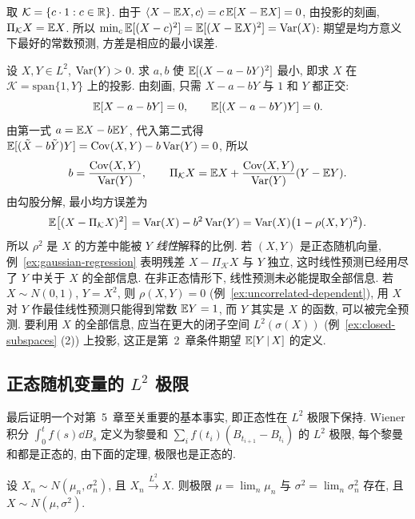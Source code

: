 \begin{example}[最佳常数预测]\label{ex:best-constant}
取 $\mathcal{K}=\{c\cdot1: c\in\mathbb{R}\}$. 由于 $\langle X-\mathbb{E} X,c\rangle=c\,\mathbb{E}[X-\mathbb{E} X]=0$, 由投影的刻画, $\Pi_{\mathcal{K}}X=\mathbb{E} X$. 所以 $\min_c\mathbb{E}[(X-c)^2]=\mathbb{E}[(X-\mathbb{E} X)^2]=\operatorname{Var}(X)$: 期望是均方意义下最好的常数预测, 方差是相应的最小误差.
\end{example}

\begin{example}[最佳线性预测]\label{ex:best-linear}
设 $X,Y\in L^2$, $\operatorname{Var}(Y)>0$. 求 $a,b$ 使 $\mathbb{E}[(X-a-bY)^2]$ 最小, 即求 $X$ 在 $\mathcal{K}=\mathrm{span}\{1,Y\}$ 上的投影. 由刻画, 只需 $X-a-bY$ 与 $1$ 和 $Y$ 都正交:
\[
\mathbb{E}[X-a-bY]=0,\qquad \mathbb{E}[(X-a-bY)Y]=0.
\]
由第一式 $a=\mathbb{E} X-b\mathbb{E} Y$, 代入第二式得 $\mathbb{E}[(\tilde X-b\tilde Y)Y]=\operatorname{Cov}(X,Y)-b\operatorname{Var}(Y)=0$, 所以
\[
b=\frac{\operatorname{Cov}(X,Y)}{\operatorname{Var}(Y)},\qquad \Pi_{\mathcal{K}}X=\mathbb{E} X+\frac{\operatorname{Cov}(X,Y)}{\operatorname{Var}(Y)}(Y-\mathbb{E} Y).
\]
由勾股分解, 最小均方误差为
\[
\mathbb{E}\big[(X-\Pi_{\mathcal{K}}X)^2\big]=\operatorname{Var}(X)-b^2\operatorname{Var}(Y)=\operatorname{Var}(X)\big(1-\rho(X,Y)^2\big).
\]
所以 $\rho^2$ 是 $X$ 的方差中能被 $Y$ \emph{线性}解释的比例. 若 $(X,Y)$ 是正态随机向量, 例~\ref{ex:gaussian-regression} 表明残差 $X-\Pi_{\mathcal{K}}X$ 与 $Y$ 独立, 这时线性预测已经用尽了 $Y$ 中关于 $X$ 的全部信息. 在非正态情形下, 线性预测未必能提取全部信息. 若 $X\sim N(0,1)$, $Y=X^2$, 则 $\rho(X,Y)=0$ (例~\ref{ex:uncorrelated-dependent}), 用 $X$ 对 $Y$ 作最佳线性预测只能得到常数 $\mathbb{E} Y=1$, 而 $Y$ 其实是 $X$ 的函数, 可以被完全预测. 要利用 $X$ 的全部信息, 应当在更大的闭子空间 $L^2(\sigma(X))$ (例~\ref{ex:closed-subspaces} (2)) 上投影, 这正是第~2~章条件期望 $\mathbb{E}[Y\,|\,X]$ 的定义.
\end{example}

\subsection{正态随机变量的 \texorpdfstring{$L^2$}{L2} 极限}

最后证明一个对第~5~章至关重要的基本事实, 即正态性在 $L^2$ 极限下保持. Wiener 积分 $\int_0^tf(s)\dd B_s$ 定义为黎曼和 $\sum_if(t_i)(B_{t_{i+1}}-B_{t_i})$ 的 $L^2$ 极限, 每个黎曼和都是正态的, 由下面的定理, 极限也是正态的.

\begin{theorem}\label{thm:gaussian-L2-limit}
设 $X_n\sim N(\mu_n,\sigma_n^2)$, 且 $X_n\xrightarrow{L^2}X$. 则极限 $\mu=\lim_n\mu_n$ 与 $\sigma^2=\lim_n\sigma_n^2$ 存在, 且 $X\sim N(\mu,\sigma^2)$.
\end{theorem}

